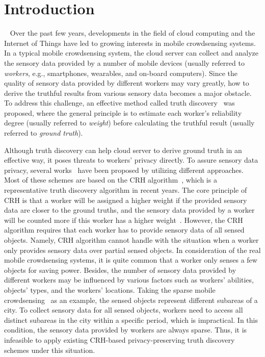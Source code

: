 \documentclass[conference]{IEEEtran}
\begin{document}
\section{Introduction}~\label{sec1}
Over the past few years, developments in the field of cloud computing and the Internet of Things have led to growing interests in mobile crowdsensing systems.
In a typical mobile crowdsensing system, the cloud server can collect and analyze the sensory data provided by a number of mobile devices (usually referred to {\em workers}, e.g., smartphones, wearables, and on-board computers).
Since the quality of sensory data provided by different workers may vary greatly, how to derive the truthful results from various sensory data becomes a major obstacle.
To address this challenge, an effective method called truth discovery~\cite{li_resolving_2014,li_confidence-aware_2014,li_conflicts_2016} was proposed, where the general principle is to estimate each worker's reliability degree (usually referred to {\em weight}) before calculating the truthful result (usually referred to {\em ground truth}).

Although truth discovery can help cloud server to derive ground truth in an effective way, it poses threats to workers' privacy directly.
To assure sensory data privacy, several works~\cite{miao_cloud-enabled_2015,miao_lightweight_2017,xu_efficient_2019,zhang_reliable_2019,xue_inpptd_2020} have been proposed by utilizing different approaches.
Most of these schemes are based on the CRH algorithm~\cite{li_resolving_2014}, which is a representative truth discovery algorithm in recent years.
The core principle of CRH is that a worker will be assigned a higher weight if the provided sensory data are closer to the ground truths, and the sensory data provided by a worker will be counted more if this worker has a higher weight~\cite{xu_efficient_2019}.
However, the CRH algorithm requires that each worker has to provide sensory data of all sensed objects.
Namely, CRH algorithm cannot handle with the situation when a worker only provides sensory data over partial sensed objects.
In consideration of the real mobile crowdsensing systems, it is quite common that a worker only senses a few objects for saving power.
Besides, the number of sensory data provided by different workers may be influenced by various factors such as workers' abilities, objects' types, and the workers' locations.
Taking the sparse mobile crowdsensing~\cite{wang_sparse_2016} as an example, the sensed objects represent different subareas of a city.
To collect sensory data for all sensed objects, workers need to access all distinct subareas in the city within a specific period, which is impractical.
In this condition, the sensory data provided by workers are always sparse.
Thus, it is infeasible to apply existing CRH-based privacy-preserving truth discovery schemes under this situation.
\end{document}
